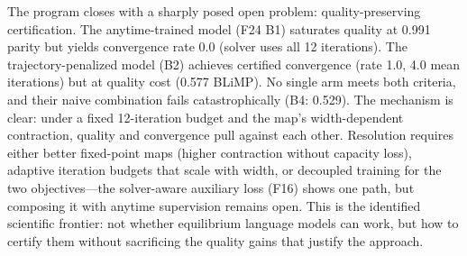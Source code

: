 The program closes with a sharply posed open problem: quality-preserving certification. The anytime-trained model (F24 B1) saturates quality at 0.991 parity but yields convergence rate 0.0 (solver uses all 12 iterations). The trajectory-penalized model (B2) achieves certified convergence (rate 1.0, 4.0 mean iterations) but at quality cost (0.577 BLiMP). No single arm meets both criteria, and their naive combination fails catastrophically (B4: 0.529). The mechanism is clear: under a fixed 12-iteration budget and the map's width-dependent contraction, quality and convergence pull against each other. Resolution requires either better fixed-point maps (higher contraction without capacity loss), adaptive iteration budgets that scale with width, or decoupled training for the two objectives---the solver-aware auxiliary loss (F16) shows one path, but composing it with anytime supervision remains open. This is the identified scientific frontier: not whether equilibrium language models can work, but how to certify them without sacrificing the quality gains that justify the approach.

